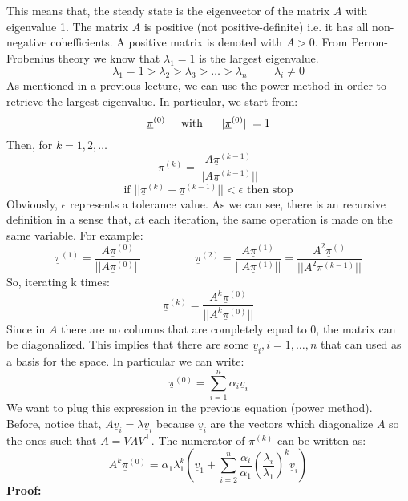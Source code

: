 This means that, the steady state is the eigenvector of the matrix $A$ with eigenvalue 1. The matrix $A$ is positive (not positive-definite) i.e. it has all non-negative cohefficients. A positive matrix is denoted with $A > 0$.
From Perron-Frobenius theory we know that $\lambda_1 = 1$ is the largest eigenvalue.
\[
    \lambda_1 = 1 > \lambda_2 > \lambda_3 > \dots > \lambda_n \hspace{1cm} \lambda_i \neq 0
\] 
As mentioned in a previous lecture, we can use the power method in order to retrieve the largest eigenvalue. In particular, we start from:
\[
    \underline{\pi}^{(0)} \hspace{0.5cm}\text{with}\hspace{0.5cm} ||\underline{\pi}^{(0)}||=1    
\]
Then, for $k = 1, 2, \dots $
\[
    \underline{\pi}^{(k)} = \dfrac{A\underline{\pi}^{(k-1)}}{||A\underline{\pi}^{(k-1)}||}    
\]
\[
    \text{if } ||\underline{\pi}^{(k)} - \underline{\pi}^{(k-1)}|| < \epsilon \text{ then stop}    
\]
Obviously, $\epsilon$ represents a tolerance value. As we can see, there is an recursive definition in a sense that, at each iteration, the same operation is made on the same variable. For example:
\[
    \underline{\pi}^{(1)} = \dfrac{A\underline{\pi}^{(0)}}{||A\underline{\pi}^{(0)}||}    
    \hspace{2cm}
    \underline{\pi}^{(2)} = \dfrac{A\underline{\pi}^{(1)}}{||A\underline{\pi}^{(1)}||} = \dfrac{A^2\underline{\pi}^{()}}{||A^2\underline{\pi}^{(k-1)}||} 
\]
So, iterating k times:
\[
    \underline{\pi}^{(k)} = \dfrac{A^k\underline{\pi}^{(0)}}{||A^k\underline{\pi}^{(0)}||}     
\]
Since in $A$ there are no columns that are completely equal to 0, the matrix can be diagonalized. This implies that there are some $\underline{v}_i, i = 1, \dots, n$ that can used as a basis for the space. In particular we can write:
\[
    \underline{\pi}^{(0)} = \sum_{i=1}^n \alpha_i \underline{v}_i
\]
We want to plug this expression in the previous equation (power method). Before, notice that, $A\underline{v}_i = \lambda \underline{v}_i$ because $\underline{v}_i$ are the vectors which diagonalize $A$ so the ones such that $A = V\Lambda V^\intercal$. 
The numerator of $\underline{\pi}^{(k)}$ can be written as:
\[
    A^k \underline{\pi}^{(0)} = \alpha_1\lambda_1^k \left(\underline{v}_1 + \sum_{i=2}^{n} \dfrac{\alpha_i}{\alpha_1}\left(\dfrac{\lambda_i}{\lambda_1}\right)^k \underline{v}_i\right)    
\]
\textbf{Proof:}
